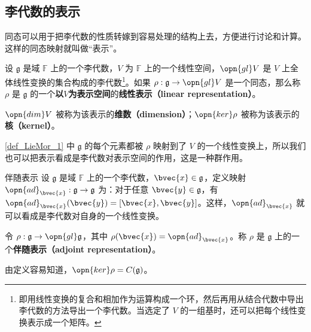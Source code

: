 \subsection{李代数的表示}

同态可以用于把李代数的性质转嫁到容易处理的结构上去，方便进行讨论和计算。这样的同态映射就叫做“表示”。

\begin{definition}{}\label{def_LieMor_1}
设 $\mathfrak{g}$ 是域 $\mathbb{F}$ 上的一个李代数，$V$ 为 $\mathbb{F}$ 上的一个线性空间，$\opn{gl}V$ 是 $V$ 上全体线性变换的集合构成的李代数\footnote{即用线性变换的复合和相加作为运算构成一个环，然后再用从结合代数中导出李代数的方法导出一个李代数。当选定了 $V$ 的一组基时，还可以把每个线性变换表示成一个矩阵。}。如果 $\rho:\mathfrak{g}\to \opn{gl}V$ 是一个同态，那么称 $\rho$ 是 $\mathfrak{g}$ 的一个\textbf{以}$V$\textbf{为表示空间}的\textbf{线性表示（linear representation）}。

$\opn{dim} V$ 被称为该表示的\textbf{维数（dimension）}；$\opn{ker}\rho$ 被称为该表示的\textbf{核（kernel）}。
\end{definition}

\autoref{def_LieMor_1} 中 $\mathfrak{g}$ 的每个元素都被 $\rho$ 映射到了 $V$ 的一个线性变换上，所以我们也可以把表示看成是李代数对表示空间的作用，这是一种群作用。



\begin{example}{伴随表示}
设 $\mathfrak{g}$ 是域 $\mathbb{F}$ 上的一个李代数，$\bvec{x}\in\mathfrak{g}$，定义映射 $\opn{ad}_{\bvec{x}} :\mathfrak{g}\to\mathfrak{g}$ 为：对于任意 $\bvec{y}\in\mathfrak{g}$，有 $\opn{ad}_{\bvec{x}}(\bvec{y})=[\bvec{x}, \bvec{y}]$。这样，$\opn{ad}_{\bvec{x}}$ 就可以看成是李代数对自身的一个线性变换。

令 $\rho:\mathfrak{g}\to\opn{gl}\mathfrak{g}$，其中 $\rho(\bvec{x})=\opn{ad}_{\bvec{x}}$。称 $\rho$ 是 $\mathfrak{g}$ 上的一个\textbf{伴随表示（adjoint representation）}。

由定义容易知道，$\opn{ker}\rho=C(\mathfrak{g})$。
\end{example}











